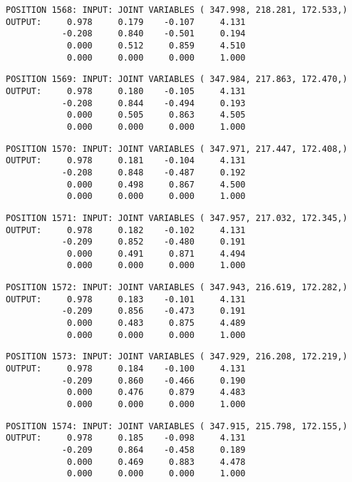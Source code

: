 \begin{verbatim}
POSITION 1568: INPUT: JOINT VARIABLES ( 347.998, 218.281, 172.533,)
OUTPUT:     0.978     0.179    -0.107     4.131
           -0.208     0.840    -0.501     0.194
            0.000     0.512     0.859     4.510
            0.000     0.000     0.000     1.000
\end{verbatim} \pagebreak[1]\begin{verbatim}
POSITION 1569: INPUT: JOINT VARIABLES ( 347.984, 217.863, 172.470,)
OUTPUT:     0.978     0.180    -0.105     4.131
           -0.208     0.844    -0.494     0.193
            0.000     0.505     0.863     4.505
            0.000     0.000     0.000     1.000
\end{verbatim} \pagebreak[1]\begin{verbatim}
POSITION 1570: INPUT: JOINT VARIABLES ( 347.971, 217.447, 172.408,)
OUTPUT:     0.978     0.181    -0.104     4.131
           -0.208     0.848    -0.487     0.192
            0.000     0.498     0.867     4.500
            0.000     0.000     0.000     1.000
\end{verbatim} \pagebreak[1]\begin{verbatim}
POSITION 1571: INPUT: JOINT VARIABLES ( 347.957, 217.032, 172.345,)
OUTPUT:     0.978     0.182    -0.102     4.131
           -0.209     0.852    -0.480     0.191
            0.000     0.491     0.871     4.494
            0.000     0.000     0.000     1.000
\end{verbatim} \pagebreak[1]\begin{verbatim}
POSITION 1572: INPUT: JOINT VARIABLES ( 347.943, 216.619, 172.282,)
OUTPUT:     0.978     0.183    -0.101     4.131
           -0.209     0.856    -0.473     0.191
            0.000     0.483     0.875     4.489
            0.000     0.000     0.000     1.000
\end{verbatim} \pagebreak[1]\begin{verbatim}
POSITION 1573: INPUT: JOINT VARIABLES ( 347.929, 216.208, 172.219,)
OUTPUT:     0.978     0.184    -0.100     4.131
           -0.209     0.860    -0.466     0.190
            0.000     0.476     0.879     4.483
            0.000     0.000     0.000     1.000
\end{verbatim} \pagebreak[1]\begin{verbatim}
POSITION 1574: INPUT: JOINT VARIABLES ( 347.915, 215.798, 172.155,)
OUTPUT:     0.978     0.185    -0.098     4.131
           -0.209     0.864    -0.458     0.189
            0.000     0.469     0.883     4.478
            0.000     0.000     0.000     1.000
\end{verbatim} \pagebreak[1]\begin{verbatim}

\end{verbatim}
